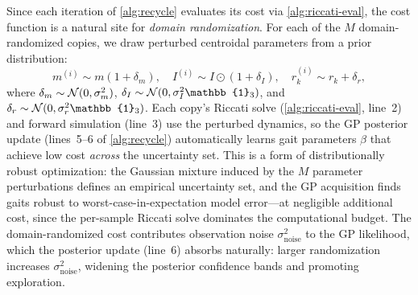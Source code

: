 \begin{remark}
\label{rem:domain-rand}
Since each iteration of \cref{alg:recycle} evaluates its cost via \cref{alg:riccati-eval}, the cost function is a natural site for \emph{domain randomization}.
For each of the $M$ domain-randomized copies, we draw perturbed centroidal parameters from a prior distribution:
\[
m^{(i)} \sim m(1 + \delta_m),\quad
I^{(i)} \sim I \odot (1 + \delta_I),\quad
r_k^{(i)} \sim r_k + \delta_r,
\]
where $\delta_m \sim \mathcal{N}(0, \sigma_m^2)$, $\delta_I \sim \cN(0, \sigma_I^2 \mathbb{1}_3)$, and $\delta_r \sim \cN(0, \sigma_r^2 \mathbb{1}_3)$.
Each copy's Riccati solve (\cref{alg:riccati-eval}, line~2) and forward simulation (line~3) use the perturbed dynamics, so the GP posterior update (lines~5--6 of \cref{alg:recycle}) automatically learns gait parameters $\beta$ that achieve low cost \emph{across} the uncertainty set.
This is a form of distributionally robust optimization: the Gaussian mixture induced by the $M$ parameter perturbations defines an empirical uncertainty set, and the GP acquisition finds gaits robust to worst-case-in-expectation model error---at negligible additional cost, since the per-sample Riccati solve dominates the computational budget.
The domain-randomized cost contributes observation noise $\sigma^2_{\mathrm{noise}}$ to the GP likelihood, which the posterior update (line~6) absorbs naturally: larger randomization increases $\sigma^2_{\mathrm{noise}}$, widening the posterior confidence bands and promoting exploration.
\end{remark}


